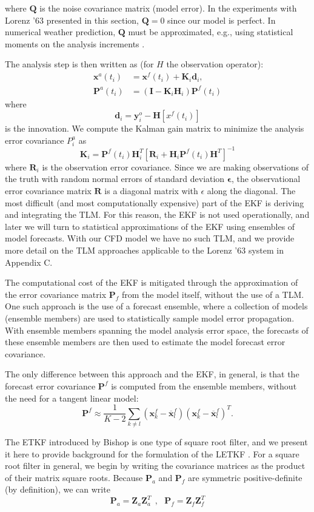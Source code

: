 \documentclass[10pt,letterpaper]{article}
\newcommand{\mbe}{\mathbf{\epsilon}}
\newcommand{\mbx}{\mathbf{x}}
\newcommand{\mby}{\mathbf{y}}
\newcommand{\mbd}{\mathbf{d}}
\newcommand{\mbR}{\mathbf{R}}
\newcommand{\mbH}{\mathbf{H}}
\newcommand{\mbK}{\mathbf{K}}
\newcommand{\mbP}{\mathbf{P}}
\newcommand{\mbZ}{\mathbf{Z}}
\begin{document}
where $\mathbf{Q}$ is the noise covariance matrix (model error).
In the experiments with Lorenz '63 presented in this section, $\mathbf{Q} = 0$ since our model is perfect.
In numerical weather prediction, $\mathbf{Q}$ must be approximated, e.g., using statistical moments on the analysis increments \cite{danforth2007estimating,li2009accounting,danforth2008using}.

The analysis step is then written as (for $H$ the observation operator):
\begin{align} \mbx^a (t_i ) &= \mbx^f (t_i) + \mbK_i \mbd_i,\\
\mbP^a (t_i) &= (\mathbf{I} - \mbK_i \mbH_i )\mbP^f (t_i) \end{align}
where
\[ \mbd_i = \mby_i^o - \mbH[x^f (t_i) ] \]
is the innovation. We compute the Kalman gain matrix to minimize the analysis error covariance $P^a _i$ as
\[ \mbK_i = \mbP^f (t_i) \mbH_i ^T [ \mbR_i + \mbH_i \mbP^f (t_i) \mbH^T ] ^{-1} \]
where $\mbR_i$ is the observation error covariance.
Since we are making observations of the truth with random normal errors of standard deviation $\mbe$, the observational error covariance matrix $\mbR$ is a diagonal matrix with $\epsilon$ along the diagonal.
The most difficult (and most computationally expensive) part of the EKF is deriving and integrating the TLM.
For this reason, the EKF is not used operationally, and later we will turn to statistical approximations of the EKF using ensembles of model forecasts.
With our CFD model we have no such TLM, and we provide more detail on the TLM approaches applicable to the Lorenz '63 system in Appendix C.

The computational cost of the EKF is mitigated through the approximation of the error covariance matrix $\mbP_f$ from the model itself, without the use of a TLM.
One such approach is the use of a forecast ensemble, where a collection of models (ensemble members) are used to statistically sample model error propagation.
With ensemble members spanning the model analysis error space, the forecasts of these ensemble members are then used to estimate the model forecast error covariance.

The only difference between this approach and the EKF, in general, is that the forecast error covariance $\mbP^f$ is computed from the ensemble members, without the need for a tangent linear model:
\[ \mbP^f \approx \frac{1}{K-2} \sum _{k\neq l} \left ( \mbx_k ^f - \overline{\mbx} ^f _l \right ) \left (\mbx_k ^f - \overline{\mbx} ^f _l \right ) ^T .\]

The ETKF introduced by Bishop is one type of square root filter, and we present it here to provide background for the formulation of the LETKF \cite{bishop2001adaptive}.
For a square root filter in general, we begin by writing the covariance matrices as the product of their matrix square roots.
Because $\mbP_a$ and $\mbP_f$ are symmetric positive-definite (by definition), we can write
\begin{equation} \mbP_a = \mbZ_a \mbZ_a^T ~~,~~~ \mbP_f = \mbZ_f \mbZ_f^T \end{equation}
\end{document}
